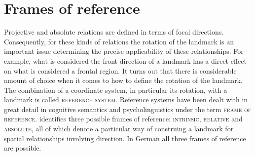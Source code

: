 \section{Frames of reference}
Projective and absolute relations are defined in terms of focal directions.
Consequently, for these kinds of relations the rotation of the landmark 
is an important issue determining the precise applicability of 
these relationships. For example, what is considered the front direction 
of a landmark has a direct effect on what is considered a frontal region. It turns out
that there is considerable amount of choice when it comes to how to
define the rotation of the landmark. The combination 
of a coordinate system, in particular its rotation, with a landmark is 
called \textsc{reference system}. Reference systems 
have been dealt with in great detail in cognitive semantics and 
psycholinguistics under the term \textsc{frame of reference}. 
\cite{levinson1996language,levinson2003space} identifies 
three possible frames of reference: \textsc{intrinsic}, \textsc{relative} 
and \textsc{absolute}, all of which denote a particular way of construing 
a landmark for spatial relationships involving direction. 
In German all three frames of reference are possible.


